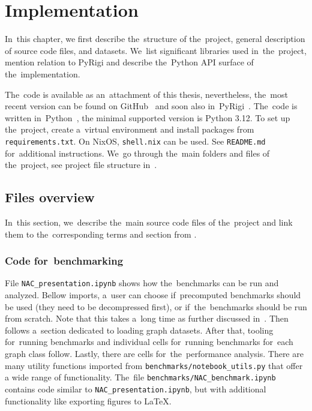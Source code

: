 
\chapter{Implementation}%
\label{chapter:impl}

\begin{chapterabstract}

	In~this chapter,
	we first describe the~structure of the~project,
	general description of source code files, and datasets.
	We~list significant libraries used in~the~project,
	mention relation to PyRigi and
	describe the~Python API surface of the~implementation.

\end{chapterabstract}

The~code is available as an~attachment of this thesis,
nevertheless, the~most recent version can be found on GitHub~\cite{my_code}
and soon also in~PyRigi~\cite{pyrigi}.
%
The~code is written in~Python~\cite{python}, the minimal supported version is Python 3.12.
To set up the~project, create a~virtual environment and install packages
from \texttt{requirements.txt}. On NixOS, \texttt{shell.nix} can be used.
See \texttt{README.md} for~additional instructions.
We~go through the~main folders and files of the~project,
see project file structure in~.


\section{Files overview}

In~this section, we~describe the~main source code files of the~project
and link them to the~corresponding terms and section
from .

\subsection{Code for~benchmarking}

File \texttt{NAC\_presentation.ipynb} shows how the~benchmarks
can be run and analyzed.
Bellow imports, a~user can choose if~precomputed benchmarks should be used
(they need to be decompressed first),
or if~the~benchmarks should be run from scratch.
Note that this takes a~long time
as further discussed in~.
Then follows a~section dedicated to loading graph datasets.
After that, tooling for~running benchmarks and individual cells
for~running benchmarks for~each graph class follow.
Lastly, there are cells for~the~performance analysis.
%
There are many utility functions
imported from \texttt{benchmarks/notebook\_utils.py}
that offer a wide range of functionality.
The~file \texttt{benchmarks/NAC\_benchmark.ipynb}
contains code similar to \texttt{NAC\_presentation.ipynb},
but with additional functionality like exporting figures to \LaTeX{}.

